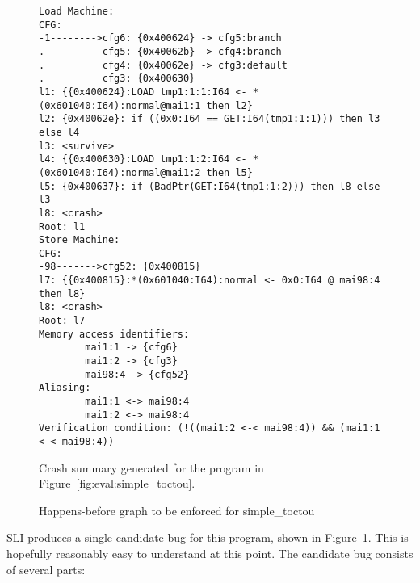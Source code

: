 \begin{figure}
  \begin{minipage}{100mm}
\begin{verbatim}
Load Machine:
CFG:
-1-------->cfg6: {0x400624} -> cfg5:branch
.          cfg5: {0x40062b} -> cfg4:branch
.          cfg4: {0x40062e} -> cfg3:default
.          cfg3: {0x400630}
l1: {{0x400624}:LOAD tmp1:1:1:I64 <- *(0x601040:I64):normal@mai1:1 then l2}
l2: {0x40062e}: if ((0x0:I64 == GET:I64(tmp1:1:1))) then l3 else l4
l3: <survive>
l4: {{0x400630}:LOAD tmp1:1:2:I64 <- *(0x601040:I64):normal@mai1:2 then l5}
l5: {0x400637}: if (BadPtr(GET:I64(tmp1:1:2))) then l8 else l3
l8: <crash>
Root: l1
Store Machine:
CFG:
-98------->cfg52: {0x400815}
l7: {{0x400815}:*(0x601040:I64):normal <- 0x0:I64 @ mai98:4 then l8}
l8: <crash>
Root: l7
Memory access identifiers:
        mai1:1 -> {cfg6}
        mai1:2 -> {cfg3}
        mai98:4 -> {cfg52}
Aliasing:
        mai1:1 <-> mai98:4
        mai1:2 <-> mai98:4
Verification condition: (!((mai1:2 <-< mai98:4)) && (mai1:1 <-< mai98:4))
\end{verbatim}
  \end{minipage}
  \caption{Crash summary generated for the program in
    Figure~\ref{fig:eval:simple_toctou}.}
  \label{fig:eval:simple_toctou_summary}
\end{figure}

\begin{figure}
  \caption{Happens-before graph to be enforced for simple\_toctou}
  \label{fig:eval:simple_toctou_hb_graph}
\end{figure}

SLI produces a single candidate bug for this program, shown in
Figure~\ref{fig:eval:simple_toctou_summary}.  This is hopefully
reasonably easy to understand at this point.  The candidate bug
consists of several parts:


